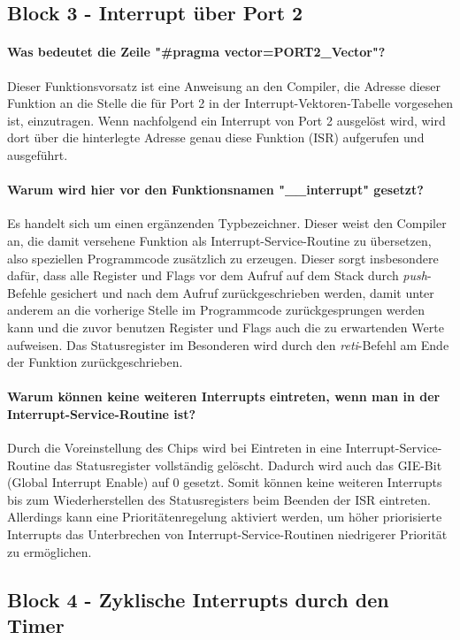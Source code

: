 \documentclass[12pt,a4paper,bibliography=totocnumbered,listof=totocnumbered]{scrartcl}
\begin{document}
\subsection{Block 3 - Interrupt über Port 2}
\paragraph{Was bedeutet die Zeile "\#pragma vector=PORT2\_Vector"?}
Dieser Funktionsvorsatz ist eine Anweisung an den Compiler, die Adresse dieser Funktion an die Stelle die für Port 2 in der Interrupt-Vektoren-Tabelle vorgesehen ist, einzutragen. Wenn nachfolgend ein Interrupt von Port 2 ausgelöst wird, wird dort über die hinterlegte Adresse genau diese Funktion (ISR) aufgerufen und ausgeführt.

\paragraph{Warum wird hier vor den Funktionsnamen "\_\_interrupt" gesetzt?}
Es handelt sich um einen ergänzenden Typbezeichner. Dieser weist den Compiler an, die damit versehene Funktion als Interrupt-Service-Routine zu übersetzen, also speziellen Programmcode zusätzlich zu erzeugen. Dieser sorgt insbesondere dafür, dass alle Register und Flags vor dem Aufruf auf dem Stack durch \textit{push}-Befehle gesichert und nach dem Aufruf zurückgeschrieben werden, damit unter anderem an die vorherige Stelle im Programmcode zurückgesprungen werden kann und die zuvor benutzen Register und Flags auch die zu erwartenden Werte aufweisen. Das Statusregister im Besonderen wird durch den \textit{reti}-Befehl am Ende der Funktion zurückgeschrieben.

\paragraph{Warum können keine weiteren Interrupts eintreten, wenn man in der Interrupt-Service-Routine ist?}
Durch die Voreinstellung des Chips wird bei Eintreten in eine Interrupt-Service-Routine das Statusregister vollständig gelöscht. Dadurch wird auch das GIE-Bit (Global Interrupt Enable) auf 0 gesetzt. Somit können keine weiteren Interrupts bis zum Wiederherstellen des Statusregisters beim Beenden der ISR eintreten. Allerdings kann eine Prioritätenregelung aktiviert werden, um höher priorisierte Interrupts das Unterbrechen von Interrupt-Service-Routinen niedrigerer Priorität zu ermöglichen. \cite[Seite 38]{MSP430x2xx.Users.Guide}


\subsection{Block 4 - Zyklische Interrupts durch den Timer}
\end{document}
